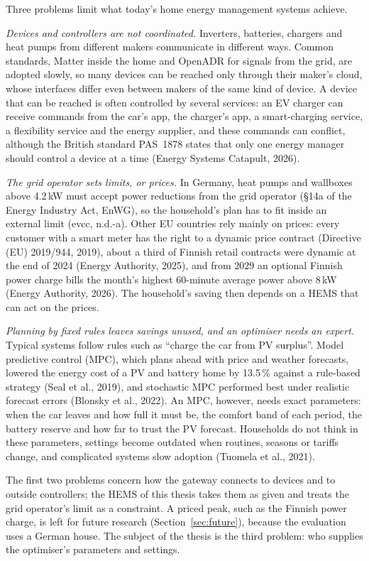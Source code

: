 \documentclass[12pt,a4paper]{report}
\begin{document}
Three problems limit what today's home energy management systems
achieve.

\textit{Devices and controllers are not coordinated.} Inverters,
batteries, chargers and heat pumps from different makers communicate in
different ways. Common standards, Matter inside the home and OpenADR for
signals from the grid, are adopted slowly, so many devices can be
reached only through their maker's cloud, whose interfaces differ even
between makers of the same kind of device. A device that can be reached
is often controlled by several services: an EV charger can receive
commands from the car's app, the charger's app, a smart-charging
service, a flexibility service and the energy supplier, and these
commands can conflict, although the British standard PAS~1878 states
that only one energy manager should control a device at a time
(Energy Systems Catapult, 2026).

\textit{The grid operator sets limits, or prices.} In Germany, heat
pumps and wallboxes above 4.2\,kW must accept power
reductions from the grid operator (§14a of the Energy Industry Act,
EnWG), so the household's plan has to fit inside an external limit
(evcc, n.d.-a). Other EU countries rely mainly on prices: every
customer with a smart meter has the right to a dynamic price contract
(Directive (EU) 2019/944, 2019), about a third of Finnish retail contracts were
dynamic at the end of 2024 (Energy Authority, 2025), and from
2029 an optional Finnish power charge bills the month's highest
60-minute average power above 8\,kW (Energy Authority, 2026). The
household's saving then depends on a HEMS that can act on the prices.

\textit{Planning by fixed rules leaves savings unused, and an optimiser
needs an expert.} Typical systems follow rules such as ``charge the car
from PV surplus''. Model predictive control (MPC), which plans ahead
with price and weather forecasts, lowered the energy cost of a PV and
battery home by 13.5\,\% against a rule-based strategy
(Seal et al., 2019), and stochastic MPC performed best under realistic
forecast errors (Blonsky et al., 2022). An MPC, however, needs exact
parameters: when the car leaves and how full it must be, the comfort
band of each period, the battery reserve and how far to trust the PV
forecast. Households do not think in these parameters, settings become
outdated when routines, seasons or tariffs change, and complicated
systems slow adoption (Tuomela et al., 2021).

The first two problems concern how the gateway connects to devices and
to outside controllers; the HEMS of this thesis takes them as given and
treats the grid operator's limit as a constraint. A priced peak, such as
the Finnish power charge, is left for future research
(Section~\ref{sec:future}), because the evaluation uses a German house.
The subject of the thesis is the third problem: who supplies the
optimiser's parameters and settings.
\end{document}

